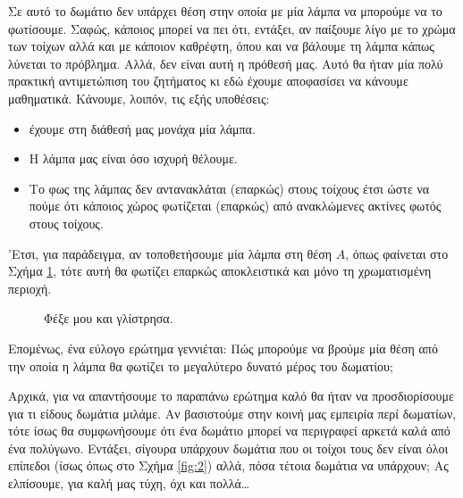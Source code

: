 \documentclass[11pt,a4paper]{article}
\theoremstyle{definition}
\begin{document}
	Σε αυτό το δωμάτιο δεν υπάρχει θέση στην οποία με μία λάμπα να μπορούμε να το φωτίσουμε. Σαφώς, κάποιος μπορεί να πει ότι, εντάξει, αν παίξουμε λίγο με το χρώμα των τοίχων αλλά και με κάποιον καθρέφτη, όπου και να βάλουμε τη λάμπα κάπως λύνεται το πρόβλημα. Αλλά, δεν είναι αυτή η πρόθεσή μας. Αυτό θα ήταν μία πολύ πρακτική αντιμετώπιση του ζητήματος κι εδώ έχουμε αποφασίσει να κάνουμε μαθηματικά. Κάνουμε, λοιπόν, τις εξής υποθέσεις:
	\begin{itemize}
		\item έχουμε στη διάθεσή μας μονάχα μία λάμπα.
		\item Η λάμπα μας είναι όσο ισχυρή θέλουμε.
		\item Το φως της λάμπας δεν αντανακλάται (επαρκώς) στους τοίχους έτσι ώστε να πούμε ότι κάποιος χώρος φωτίζεται (επαρκώς) από ανακλώμενες ακτίνες φωτός στους τοίχους.
	\end{itemize}
	'Ετσι, για παράδειγμα, αν τοποθετήσουμε μία λάμπα στη θέση $A$, όπως φαίνεται στο Σχήμα \ref{fig:6}, τότε αυτή θα φωτίζει επαρκώς αποκλειστικά και μόνο τη χρωματισμένη περιοχή.
	\begin{figure}[!htb]
		\centering
		\caption{Φέξε μου και γλίστρησα.}
		\label{fig:6}
	\end{figure}
	Επομένως, ένα εύλογο ερώτημα γεννιέται: Πώς μπορούμε να βρούμε μία θέση από την οποία η λάμπα θα φωτίζει το μεγαλύτερο δυνατό μέρος του δωματίου;
	
	Αρχικά, για να απαντήσουμε το παραπάνω ερώτημα καλό θα ήταν να προσδιορίσουμε για τι είδους δωμάτια μιλάμε. Αν βασιστούμε στην κοινή μας εμπειρία περί δωματίων, τότε ίσως θα συμφωνήσουμε ότι ένα δωμάτιο μπορεί να περιγραφεί αρκετά καλά από ένα  πολύγωνο. Εντάξει, σίγουρα υπάρχουν δωμάτια που οι τοίχοι τους δεν είναι όλοι επίπεδοι (ίσως όπως στο Σχήμα \ref{fig:2}) αλλά, πόσα τέτοια δωμάτια να υπάρχουν; Ας ελπίσουμε, για καλή μας τύχη, όχι και πολλά\ldots
	
\end{document}
